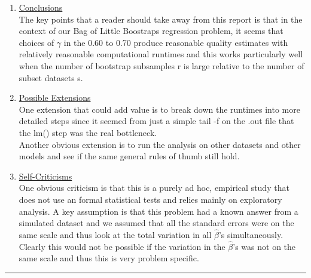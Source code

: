 \documentclass[a4paper, 11pt]{report}
\begin{document}
\begin{enumerate}
	    \item \Large\underline{Conclusions}\normalsize \\  
	    
	    	The key points that a reader should take away from this report is that in the context of our Bag of Little Boostraps regression problem, it seems that choices of $\gamma$ in the 0.60 to 0.70 produce reasonable quality estimates with relatively reasonable computational runtimes and this works particularly well when the number of bootstrap subsamples r is large relative to the number of subset datasets s. \\
	    
	    \item \Large\underline{Possible Extensions}\normalsize \\
	    
		    One extension that could add value is to break down the runtimes into more detailed steps since it seemed from just a simple tail -f on the .out file that the lm() step was the real bottleneck.  \\
		    
		    Another obvious extension is to run the analysis on other datasets and other models and see if the same general rules of thumb still hold. \\
	    
	    \item \Large\underline{Self-Criticisms}\normalsize \\
	    
	    	One obvious criticism is that this is a purely ad hoc, empirical study that does not use an formal statistical tests and relies mainly on exploratory analysis.  A key assumption is that this problem had a known answer from a simulated dataset and we assumed that all the standard errors were on the same scale and thus look at the total variation in all $\widehat{\beta}$'s simultaneously.  Clearly this would not be possible if the variation in the $\widehat{\beta}$'s was not on the same scale and thus this is very problem specific.  \\

	\end{enumerate}
	\noindent\rule{\textwidth}{1pt} \\
	
	\newpage
	
\end{document}
